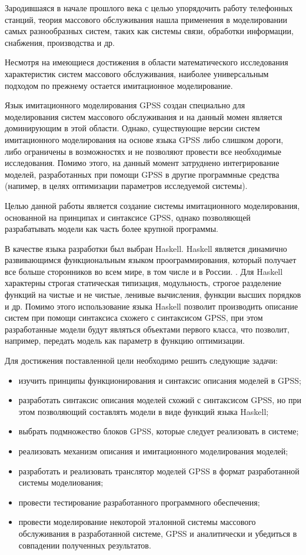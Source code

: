 \Introduction

Зародившаяся в начале прошлого века с целью упорядочить работу телефонных станций, теория массового обслуживания нашла применения в моделировании самых разнообразных систем, таких как системы связи, обработки информации, снабжения, производства и др.

Несмотря на имеющиеся достижения в области математического исследования характеристик систем массового обслуживания, наиболее универсальным подходом по прежнему остается имитационное моделирование.

Язык имитационного моделирования GPSS создан специально для моделирования систем массового обслуживания и на данный момен является доминирующим в этой области. Однако, существующие версии систем имитационного моделирования на основе языка GPSS либо слишком дороги, либо ограничены в возможностях и не позволяют провести все необходимые исследования.\cite{KST} Помимо этого, на данный момент затруднено интегрирование моделей, разработанных при помощи GPSS в другие программные средства (напимер, в целях оптимизации параметров исследуемой системы).

Целью данной работы является создание системы имитационного моделирования, основанной на принципах и синтаксисе GPSS, однако позволяющей разрабатывать модели как часть более крупной программы.

В качестве языка разработки был выбран Haskell. Haskell является динамично развивающимся функциональным языком проограммирования, который получает все больше сторонников во всем мире, в том числе и в России. \cite{HaskellRef}. Для Haskell характерны строгая статическая типизация, модульность, строгое разделение функций на чистые и не чистые, ленивые вычисления, функции высших порядков и др.\cite{Haskell} Помимо этого использование языка Haskell позволит производить описание систем при помощи синтаксиса схожего с синтаксисом GPSS, при этом разработанные модели будут являться объектами первого класса, что позволит, например, передать модель как параметр в функцию оптимизации.

Для достижения поставленной цели необходимо решить следующие задачи:
\begin{itemize}
\item изучить принципы функционирования и синтаксис описания моделей в GPSS;
\item разработать синтаксис описания моделей схожий с синтаксисом GPSS, но при этом позволяющий составлять модели в виде функций языка Haskell;
\item выбрать подмножество блоков GPSS, которые следует реализовать в системе;
\item реализовать механизм описания и имитационного моделирования моделей;
\item разработать и реализовать транслятор моделей GPSS в формат разработанной системы моделиования;
\item провести тестирование разработанного программного обеспечения;
\item провести моделирование некоторой эталонной системы массового обслуживания в разработанной системе, GPSS и аналитически и убедиться в совпадении полученных результатов.
\end{itemize}


